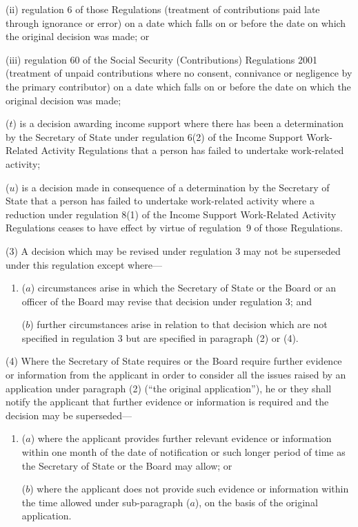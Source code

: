\documentclass[12pt,a4paper]{article}
\begin{document}
\begin{enumerate}
\begin{enumerate}
(ii) regulation 6 of those Regulations (treatment of contributions paid late through ignorance or error) on a date which falls on or before the date on which the original decision was made; or

(iii) regulation 60 of the Social Security (Contributions) Regulations 2001 (treatment of unpaid contributions where no consent, connivance or negligence by the primary contributor) on a date which falls on or before the date on which the original decision was made;
\end{enumerate}

($t$) is a decision awarding income support where there has been a determination by the Secretary of State under regulation 6(2) of the Income Support Work-Related Activity Regulations that a person has failed to undertake work-related activity;

($u$) is a decision made in consequence of a determination by the Secretary of State that a person has failed to undertake work-related activity where a reduction under regulation 8(1) of the Income Support Work-Related Activity Regulations ceases to have effect by virtue of regulation~9 of those Regulations.
\end{enumerate}

(3) A decision which may be revised under regulation 3 may not be superseded under this regulation except where—
\begin{enumerate}\item[]
($a$) circumstances arise in which the Secretary of State 
or the Board or an officer of the Board  %
may revise that decision under regulation 3; and

($b$) further circumstances arise in relation to that decision which are not specified in regulation 3 but are specified in paragraph (2) or (4).
\end{enumerate}

(4) Where the Secretary of State requires 
or the Board require  %
further evidence or information from the applicant in order to consider all the issues raised by an application under paragraph (2) (“the original application”), he 
or they  %
shall notify the applicant that further evidence or information is required and the decision may be superseded—
\begin{enumerate}\item[]
($a$) where the applicant provides further relevant evidence or information within one month of the date of notification or such longer period of time as the Secretary of State 
or the Board  %
may allow; or

($b$) where the applicant does not provide such evidence or information within the time allowed under sub-paragraph ($a$), on the basis of the original application.
\end{enumerate}
\end{document}

